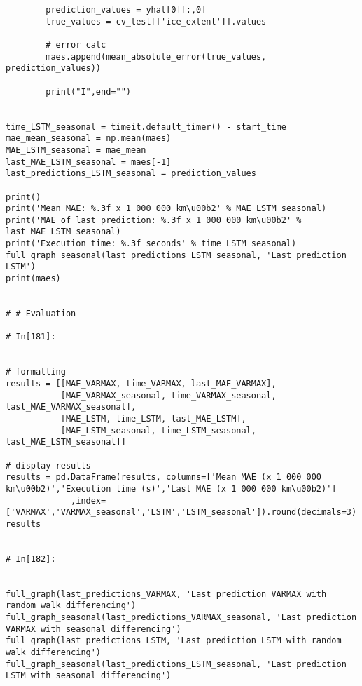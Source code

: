 \begin{verbatim}
        prediction_values = yhat[0][:,0]
        true_values = cv_test[['ice_extent']].values

        # error calc
        maes.append(mean_absolute_error(true_values, prediction_values))

        print("I",end="")
    

time_LSTM_seasonal = timeit.default_timer() - start_time
mae_mean_seasonal = np.mean(maes)
MAE_LSTM_seasonal = mae_mean
last_MAE_LSTM_seasonal = maes[-1]
last_predictions_LSTM_seasonal = prediction_values

print()
print('Mean MAE: %.3f x 1 000 000 km\u00b2' % MAE_LSTM_seasonal)
print('MAE of last prediction: %.3f x 1 000 000 km\u00b2' % last_MAE_LSTM_seasonal)
print('Execution time: %.3f seconds' % time_LSTM_seasonal)
full_graph_seasonal(last_predictions_LSTM_seasonal, 'Last prediction LSTM')
print(maes)


# # Evaluation

# In[181]:


# formatting
results = [[MAE_VARMAX, time_VARMAX, last_MAE_VARMAX],
           [MAE_VARMAX_seasonal, time_VARMAX_seasonal, last_MAE_VARMAX_seasonal],
           [MAE_LSTM, time_LSTM, last_MAE_LSTM],
           [MAE_LSTM_seasonal, time_LSTM_seasonal, last_MAE_LSTM_seasonal]]

# display results
results = pd.DataFrame(results, columns=['Mean MAE (x 1 000 000 km\u00b2)','Execution time (s)','Last MAE (x 1 000 000 km\u00b2)']
             ,index=['VARMAX','VARMAX_seasonal','LSTM','LSTM_seasonal']).round(decimals=3)
results


# In[182]:


full_graph(last_predictions_VARMAX, 'Last prediction VARMAX with random walk differencing')
full_graph_seasonal(last_predictions_VARMAX_seasonal, 'Last prediction VARMAX with seasonal differencing')
full_graph(last_predictions_LSTM, 'Last prediction LSTM with random walk differencing')
full_graph_seasonal(last_predictions_LSTM_seasonal, 'Last prediction LSTM with seasonal differencing')
\end{verbatim}


